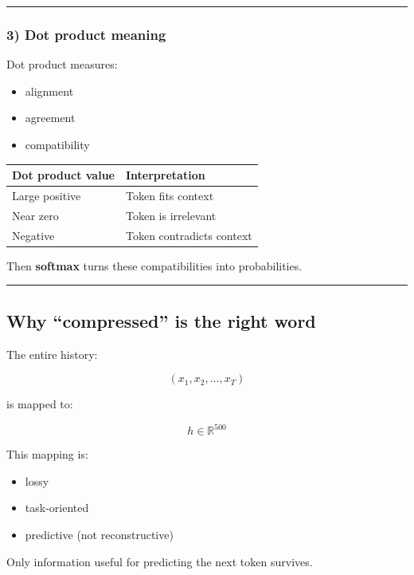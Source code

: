 \documentclass[
]{article}
\providecommand{\tightlist}{%
  \setlength{\itemsep}{0pt}\setlength{\parskip}{0pt}}
\begin{document}
\begin{center}\rule{0.5\linewidth}{0.5pt}\end{center}

\hypertarget{dot-product-meaning}{%
\subsubsection{3) Dot product meaning}\label{dot-product-meaning}}

Dot product measures:

\begin{itemize}
\tightlist
\item
  alignment
\item
  agreement
\item
  compatibility
\end{itemize}

\begin{longtable}[]{@{}ll@{}}
\toprule
Dot product value & Interpretation\tabularnewline
\midrule
\endhead
Large positive & Token fits context\tabularnewline
Near zero & Token is irrelevant\tabularnewline
Negative & Token contradicts context\tabularnewline
\bottomrule
\end{longtable}

Then \textbf{softmax} turns these compatibilities into probabilities.

\begin{center}\rule{0.5\linewidth}{0.5pt}\end{center}

\hypertarget{why-compressed-is-the-right-word}{%
\subsection{Why ``compressed'' is the right
word}\label{why-compressed-is-the-right-word}}

The entire history:

\[
(x_1, x_2, \dots, x_T)
\]

is mapped to:

\[
h \in \mathbb{R}^{500}
\]

This mapping is:

\begin{itemize}
\tightlist
\item
  lossy
\item
  task-oriented
\item
  predictive (not reconstructive)
\end{itemize}

Only information useful for predicting the next token survives.
\end{document}
